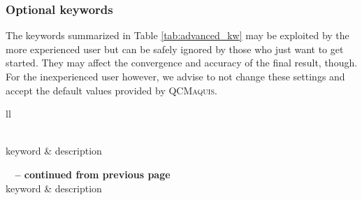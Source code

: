 \documentclass[bibliography=totoc,12pt,a4paper]{scrartcl}
\newcommand{\qcm}{\textsc{QCMaquis}}
\begin{document}
\subsubsection{Optional keywords}
\label{sec:optional-qcm}

The keywords summarized in Table \ref{tab:advanced_kw} may be exploited by the more experienced user but can be safely
ignored by those who just want to get started. They may affect the convergence and accuracy of the final result, though.
For the inexperienced user however, we advise to not change these settings and accept the default values provided by \qcm.


\begin{longtable}{ll}
\caption{Optional keywords for \qcm\ calculations.}\label{tab:advanced_kw}
\\
  \toprule
keyword & description \\
  \midrule
\endfirsthead

%
{{\bfseries \tablename\ \thetable{} -- continued from previous page}} \\
\toprule
keyword & description \\
\midrule
\endhead


\end{longtable}
\end{document}
